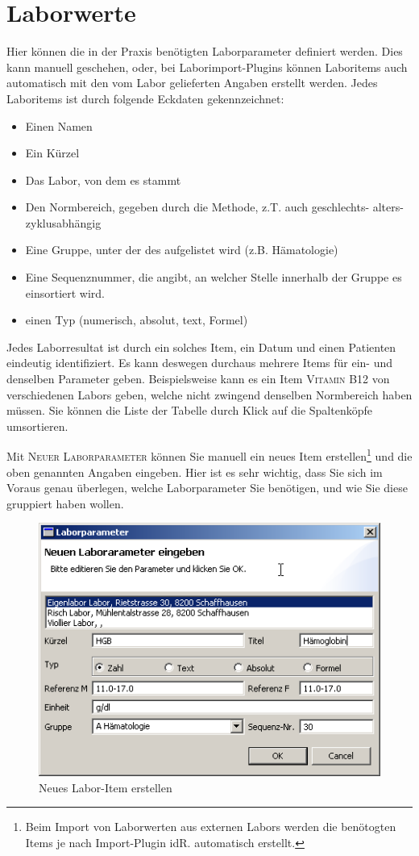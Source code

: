 \section{Laborwerte}
\label{config:labor}
Hier können die in der Praxis benötigten Laborparameter definiert werden. Dies kann manuell geschehen, oder, bei Laborimport-Plugins können Laboritems auch automatisch mit den vom Labor gelieferten Angaben erstellt werden.
Jedes Laboritems ist durch folgende Eckdaten gekennzeichnet:
\begin{itemize}
\item{Einen Namen}
\item{Ein Kürzel}
\item{Das Labor, von dem es stammt}
\item{Den Normbereich, gegeben durch die Methode, z.T. auch geschlechts- alters- zyklusabhängig}
\item{Eine Gruppe, unter der des aufgelistet wird (z.B. Hämatologie)}
\item{Eine Sequenznummer, die angibt, an welcher Stelle innerhalb der Gruppe es einsortiert wird.}
\item{einen Typ (numerisch, absolut, text, Formel)}
\end{itemize}

Jedes Laborresultat ist durch ein solches Item, ein Datum und einen Patienten eindeutig identifiziert.
Es kann deswegen durchaus mehrere Items für ein- und denselben Parameter geben. Beispielsweise kann es ein Item \textsc{Vitamin B12} von verschiedenen Labors geben, welche nicht zwingend denselben Normbereich haben müssen.
Sie können die Liste der Tabelle durch Klick auf die Spaltenköpfe umsortieren.

Mit \textsc{Neuer Laborparameter} können Sie manuell ein neues Item erstellen\footnote{Beim Import von Laborwerten aus externen Labors werden die benötogten Items je nach Import-Plugin idR. automatisch erstellt.} und die oben genannten Angaben eingeben. Hier ist es sehr wichtig, dass Sie sich im Voraus genau überlegen, welche Laborparameter Sie benötigen, und wie Sie diese gruppiert haben wollen.
\begin{figure}[htp]
\begin{center}
  \includegraphics{images/labor1}
  \caption{Neues Labor-Item erstellen}
  \label{fig:labor1}
\end{center}
\end{figure}

